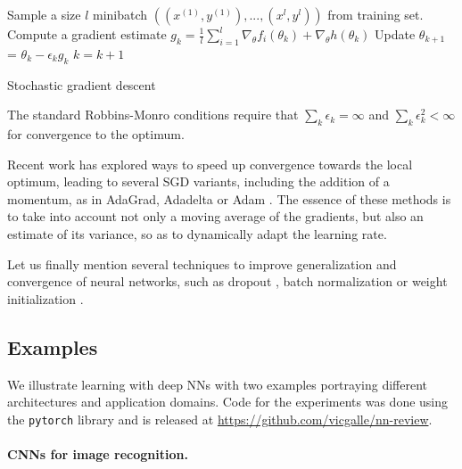 \begin{algorithm}[!ht]
\begin{algorithmic}[1]
  \State Sample a size $l$ minibatch 
      $((x^{(1)}, y^{(1)}),..., (x^{l},y^{l})) $
              from training set. 
\State Compute a gradient estimate
      $g_k = \frac{1}{l} \sum_{i=1}^l \nabla_{\theta} f_i(\theta_k) + \nabla_{\theta} h(\theta_k)$
\State    Update $\theta_{k+1} $ = $\theta_k -\epsilon _k g_k$ 
\State    $k=k+1$ 
 \EndWhile
\end{algorithmic}
 \caption{Stochastic gradient descent}\label{alg:sgd}
\end{algorithm}

\noindent The standard Robbins-Monro conditions require
that $\sum _k \epsilon_k = \infty$ and 
$\sum _k \epsilon _k^2 < \infty $ for convergence to the optimum.

Recent work has explored ways to 
speed up convergence towards the local optimum, 
leading to several SGD variants, including the 
 addition of a momentum, as in AdaGrad, Adadelta or Adam \parencite{kingma2014adam,duchi2011adaptive,zeiler2012adadelta}. The essence of these methods is to take into account not only a moving average of the gradients, but also an estimate of its variance, so as to dynamically adapt the learning rate. 

Let us finally mention 
several techniques to improve generalization and convergence of neural networks, such as dropout \parencite{srivastava2014dropout}, batch normalization \parencite{ioffe2015batch} or weight initialization \parencite{glorot2010understanding}.



\subsection{Examples}\label{sec:nn_examples}
We illustrate learning with deep NNs with two examples portraying
different architectures and application domains. Code for the experiments was done using the \texttt{pytorch} library \parencite{paszke2017automatic} and is released at \url{https://github.com/vicgalle/nn-review}.

\paragraph{CNNs for image recognition.}\label{kkvision}


